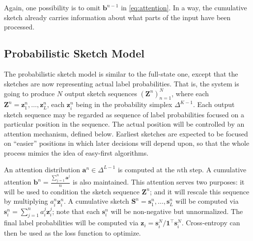 \documentclass[10pt,a4paper]{article}
\newcommand{\vect}[1]{\mathbf{#1}}
\newcommand{\matr}[1]{\mathbf{#1}}
\newcommand{\vectsymb}[1]{\boldsymbol{#1}}
\newcommand{\z}{{\vectsymb{z}}}
\newcommand{\sss}{{\vectsymb{s}}}
\newcommand{\aaa}{{\vectsymb{a}}}
\newcommand{\bb}{{\vectsymb{b}}}
\newcommand{\Z}{{\matr{Z}}}
\newcommand{\SSS}{{\matr{S}}}
\begin{document}
Again, one possibility is to omit 
$\bb^{n-1}$ in \eqref{eq:attention}. 
In a way, the cumulative sketch already carries information 
about what parts of the input have been processed.



\subsection{Probabilistic Sketch Model}

The probabilistic sketch model is similar to the full-state one, except that 
the sketches are now representing actual label probabilities. That is, the system is going to produce $N$ output sketch sequences 
$(\Z^{n})_{n=1}^{N}$, where each $\Z^{n} = \z^{n}_1, \ldots, \z^{n}_L$, each $\z^{n}_i$ being in the probability simplex $\Delta^{K-1}$. 
Each output sketch sequence may be regarded as sequence of label probabilities focused on a particular position in the sequence. The actual position will be controlled by an attention mechanism, defined below. Earliest sketches are expected to be focused on ``easier'' positions in which later decisions will depend upon, so that the whole process mimics the idea of easy-first algorithms. 

An attention distribution $\aaa^n \in \Delta^{L-1}$ is computed at the $n$th step. 
A cumulative attention $\bb^{n} = \frac{\sum_{j=1}^n \aaa^j}{n}$ is also maintained.
This attention serves two purposes: it will be used to condition the sketch sequence $\Z^{n}$; and it will rescale this sequence by multiplying $a^{n}_i \z^{n}_i$. A cumulative sketch $\SSS^{n} = \sss^{n}_1, \ldots, \sss^{n}_L$ will be computed via $\sss^{n}_i = \sum_{j=1}^n a^{j}_i \z^{j}_i$; note that each $\sss^{n}_i$ will be non-negative but unnormalized. 
The final label probabilities will be computed via 
$\z_i = \sss^{N}_i / \vect{1}^{\top}\sss^{N}_i$. 
Cross-entropy can then be used as the loss function to optimize. 
\end{document}
